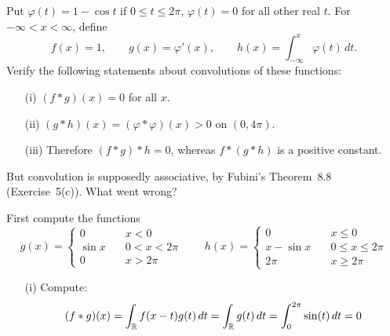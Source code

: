 \begin{enumerate}
\begin{excopy}
Put \(\varphi(t) = 1 - \cos t\) if \(0\leq t \leq 2\pi\), 
\(\varphi(t) = 0\) for all other real $t$.
For \(-\infty < x < \infty\), define
\begin{equation*}
f(x) = 1, 
\qquad g(x) = \varphi'(x),
\qquad h(x) = \int_{-\infty}^x \varphi(t)\,dt.
\end{equation*}
Verify the following statements about convolutions of these functions:
\begin{itemize}
\item[(i)] \((f\ast g)(x) = 0\) for all $x$.
\item[(ii)] \((g\ast h)(x) = (\varphi \ast \varphi)(x) > 0\) on \((0,4\pi)\).
\item[(iii)] Therefore \((f\ast g)\ast h = 0\), 
             whereas \(f\ast (g\ast h)\) is a positive constant.
\end{itemize}
But convolution is supposedly associative, by Fubini's Theorem~8.8
(Exercise~5(c)). What went wrong?
\end{excopy}

First compute the functions
\begin{equation*}
g(x) = \left\{\begin{array}{ll}
0            & x < 0 \\
\sin x \quad & 0 < x < 2\pi \\
0            & x > 2\pi
\end{array}
\right.
\qquad
h(x) = \left\{\begin{array}{ll}
0                & x \leq 0 \\
x - \sin x \quad & 0 \leq x \leq 2\pi \\
2\pi             & x \geq 2\pi
\end{array}
\right.
\end{equation*}

\begin{itemize}
\item[(i)]
Compute:
\begin{equation*}
(f\ast g)(x) 
= \int_{\mathbb{R}} f(x-t)g(t)\,dt
= \int_{\mathbb{R}} g(t)\,dt
= \int_0^{2\pi} \sin(t)\,dt 
= 0
\end{equation*}


\end{itemize}
\end{enumerate}
